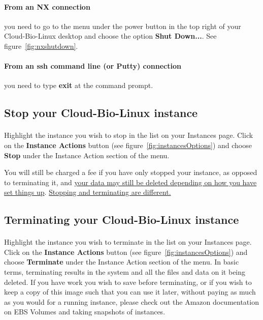 \paragraph{From an NX connection} you need to go to the menu under the power button in the top right of your Cloud-Bio-Linux desktop and choose the option \textbf{Shut Down...}. See figure~\ref{fig:nxshutdown}.

\paragraph{From an ssh command line (or Putty) connection} you need to type \textbf{exit} at the command prompt.


\subsection{Stop your Cloud-Bio-Linux instance}

\paragraph{}Highlight the instance you wish to stop in the list on your Instances page. Click on the \textbf{Instance Actions} button (see figure~\ref{fig:instancesOptions}) and choose \textbf{Stop} under the Instance Action section of the menu. 

You will still be charged a fee if you have only stopped your instance, as opposed to terminating it, and 
\href{http://docs.amazonwebservices.com/AWSEC2/latest/UserGuide/index.html?Concepts\_BootFromEBS.html\#Stop\_Start} {your data may still be deleted depending on how you have set things up}. \href{http://support.rightscale.com/06-FAQs/FAQ\_0149\_-_What\%27s\_the\_difference\_between\_Terminating\_and\_Stopping\_an\_EC2\_Instance\%3F}{Stopping and terminating are different.}

\subsection{Terminating your Cloud-Bio-Linux instance}

\paragraph{}Highlight the instance you wish to terminate in the list on your Instances page. Click on the \textbf{Instance Actions} button (see figure~\ref{fig:instancesOptions}) and choose \textbf{Terminate} under the Instance Action section of the menu. In basic terms, terminating results in the system and all the files and data on it being deleted. If you have work you wish to save before terminating, or if you wish to keep a copy of this image such that you can use it later, without paying as much as you would for a running instance, please check out the Amazon documentation on EBS Volumes and taking snapshots of instances.


